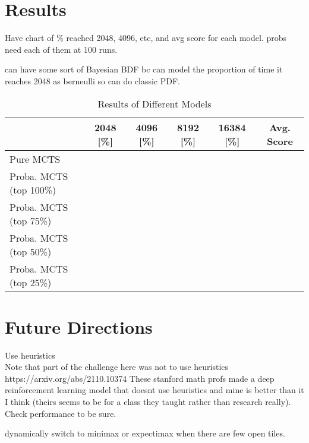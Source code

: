 \documentclass{article}
\begin{document}
\section{Results}
Have chart of \% reached 2048, 4096, etc, and avg score for each model. probs need each of them at 100 runs.

can have some sort of Bayesian BDF bc can model the proportion of time it reaches 2048 as berneulli so can do classic PDF.\\



\begin{table}[H]
  \caption{Results of Different Models}
  \begin{tabular}{|l|c|c|c|c|c|}
    \hline
    & 2048 [\%] & 4096 [\%] & 8192 [\%] & 16384 [\%] & Avg. Score \\
    \hline
    Pure MCTS & & & & & \\
    \hline
    Proba. MCTS (top 100\%) & & & & & \\
    \hline
    Proba. MCTS (top 75\%) & & & & & \\
    \hline
    Proba. MCTS (top 50\%) & & & & & \\
    \hline
    Proba. MCTS (top 25\%) & & & & & \\
    \hline
  \end{tabular}
\end{table}

\section{Future Directions}
Use heuristics\\
Note that part of the challenge here was not to use heuristics
https://arxiv.org/abs/2110.10374
These stanford math profs made a deep reinforcement learning model that doesnt use heuristics and mine is better than it I think (theirs seems to be for a class they taught rather than research really). Check performance to be sure.

dynamically switch to minimax or expectimax when there are few open tiles.
\end{document}

